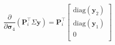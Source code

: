 \begin{equation}
\frac{\partial}{\partial \boldsymbol{\sigma}_4}\left(\mathbf{P}_i^\top\Sigma\mathbf{y}\right)
=
\mathbf{P}_i^\top
\left[
    \begin{matrix}
        \text{diag}(\mathbf{y}_2)\\
        \text{diag}(\mathbf{y}_1)\\
        0\\
    \end{matrix}
\right]
\end{equation}
